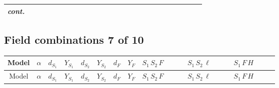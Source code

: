 \documentclass[8pt]{article}
\begin{document}
\begin{landscape}
\begin{longtable}{@{}cccccccc >{\raggedright\arraybackslash}p{0.21\linewidth} >{\raggedright\arraybackslash}p{0.21\linewidth} >{\raggedright\arraybackslash}p{0.21\linewidth}@{}}
\textit{cont.} &  &  &  &  &  &  &  &  &  & \scriptsize\adjustbox{max width=\linewidth}{$\begin{gathered} -\frac{\hbar  \overline{y_{2,i_1,r_1}} H_{a_1} H_{a_2} S_{1,j_2} y_{2,i_1,r_1} \mathcal{I}_{T3,a_1,a_2,j_2,j_1} \lambda_{T3} S_{2,j_1}{}^{\dagger }}{2 \sqrt{3}}\end{gathered}$} \\
\midrule
\bottomrule
\end{longtable}
\clearpage
\subsection*{Field combinations 7 of 10}
\begin{longtable}{@{}cccccccc >{\raggedright\arraybackslash}p{0.21\linewidth} >{\raggedright\arraybackslash}p{0.21\linewidth} >{\raggedright\arraybackslash}p{0.21\linewidth}@{}}
\toprule
Model & $\alpha$ & $d_{S_1}$ & $Y_{S_1}$ & $d_{S_2}$ & $Y_{S_2}$ & $d_F$ & $Y_F$ & $S_1\,S_2\,F$ & $S_1\,S_2\,\ell$ & $S_1\,F\,H$ \\
\midrule
\endfirsthead
\toprule
Model & $\alpha$ & $d_{S_1}$ & $Y_{S_1}$ & $d_{S_2}$ & $Y_{S_2}$ & $d_F$ & $Y_F$ & $S_1\,S_2\,F$ & $S_1\,S_2\,\ell$ & $S_1\,F\,H$ \\
\midrule
\endhead

\end{longtable}
\end{landscape}
\end{document}
